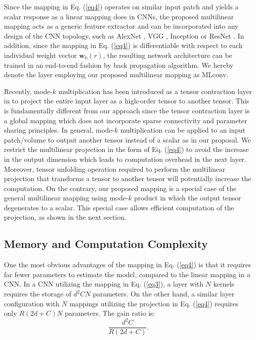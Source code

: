 \documentclass[conference,usletter]{IEEEtran}
\begin{document}
Since the mapping in Eq. (\ref{eq4}) operates on similar input patch and yields a scalar response as a linear mapping does in CNNs, the proposed multilinear mapping acts as a generic feature extractor and can be incorporated into any design of the CNN topology, such as AlexNet \cite{krizhevsky2012imagenet}, VGG \cite{simonyan2014very}, Inception \cite{szegedy2017inception} or ResNet \cite{he2016deep}. In addition, since the mapping in Eq. (\ref{eq4}) is differentiable with respect to each individual weight vector $\mathbf{w}_{k}(r)$, the resulting network architecture can be trained in an end-to-end fashion by back propagation algorithm. We hereby denote the layer employing our proposed multilinear mapping as MLconv.

Recently, mode-$k$ multiplication has been introduced as a tensor contraction layer in \cite{kossaifi2017tensor} to project the entire input layer as a high-order tensor to another tensor. This is fundamentally different from our approach since the tensor contraction layer is a global mapping which does not incorporate sparse connectivity and parameter sharing principles. In general, mode-$k$ multiplication can be applied to an input patch/volume to output another tensor instead of a scalar as in our proposal. We restrict the multilinear projection in the form of Eq. (\ref{eq4}) to avoid the increase in the output dimension which leads to computation overhead in the next layer. Moreover, tensor unfolding operation required to perform the multilinear projection that transforms a tensor to another tensor will potentially increase the computation. On the contrary, our proposed mapping is a special case of the general multilinear mapping using mode-$k$ product in which the output tensor degenerates to a scalar. This special case allows efficient computation of the projection, as shown in the next section.


\subsection{Memory and Computation Complexity}\label{SS:MemoryComputationComplexity}
One the most obvious advantages of the mapping in Eq. (\ref{eq4}) is that it requires far fewer parameters to estimate the model, compared to the linear mapping in a CNN. In a CNN utilizing the mapping in Eq. (\ref{eq3}), a layer with $N$ kernels requires the storage of $d^2CN$ parameters. On the other hand, a similar layer configuration with $N$ mappings utilizing the projection in Eq. (\ref{eq4}) requires only $R(2d+C)N$ parameters. The gain ratio is:
\begin{equation}\label{eq5}
\frac{d^2C}{R(2d+C)}.
\end{equation}
\end{document}
